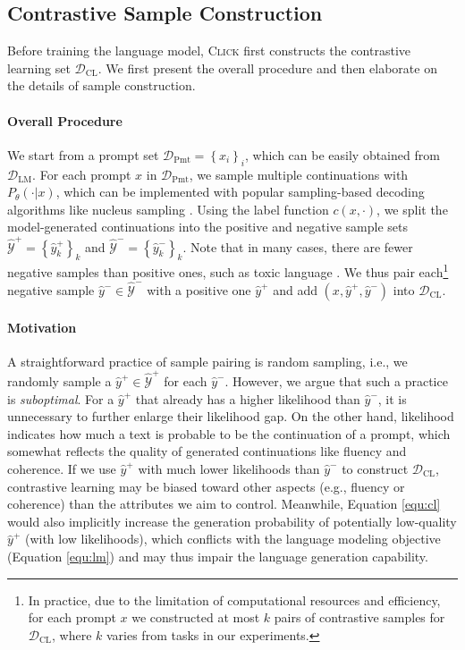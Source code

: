 \subsection{Contrastive Sample Construction}
\label{subsec:construction}

Before training the language model, \textsc{Click} first constructs the contrastive learning set $\mathcal{D}_\mathrm{CL}$.
We first present the overall procedure and then elaborate on the details of sample construction.

\paragraph{Overall Procedure} We start from a prompt set $\mathcal{D}_\mathrm{Pmt} = \left\{ x_i \right\}_i$, which can be easily obtained from $\mathcal{D}_\mathrm{LM}$.
For each prompt $x$ in $\mathcal{D}_\mathrm{Pmt}$, we sample multiple continuations with $P_{\theta} (\cdot | x )$, which can be implemented with popular sampling-based decoding algorithms like nucleus sampling \cite{topp}. Using the label function $c(x , \cdot )$, we split the model-generated continuations into the positive and negative sample sets $\widehat{\mathcal{Y}}^{+} = \left\{ \hat{y}_k^{+} \right\}_{k}$ and $\widehat{\mathcal{Y}}^{-} = \left\{ \hat{y}_k^{-} \right\}_{k}$.
Note that in many cases, there are fewer negative samples than positive ones, such as toxic language \cite{bad, red-teaming}. We thus pair each\footnote{
  In practice, due to the limitation of computational resources and efficiency, for each prompt $x$ we constructed at most $k$ pairs of contrastive samples for $\mathcal{D}_\mathrm{CL}$, where $k$ varies from tasks in our experiments. } negative sample $\hat{y}^{-} \in \widehat{\mathcal{Y}}^{-}$ with a positive one $\hat{y}^{+}$ and add $(x, \hat{y}^{+}, \hat{y}^{-})$ into $\mathcal{D}_\mathrm{CL}$.

\paragraph{Motivation}
A straightforward practice of sample pairing is random sampling, i.e., we randomly sample a $\hat{y}^{+} \in \widehat{\mathcal{Y}}^{+}$ for each $\hat{y}^{-}$.
However, we argue that such a practice is \textit{suboptimal}.
For a $\hat{y}^{+}$ that already has a higher likelihood than $\hat{y}^{-}$, it is unnecessary to further enlarge their likelihood gap. On the other hand, likelihood indicates how much a text is probable to be the continuation of a prompt, which somewhat reflects the quality of generated continuations like fluency and coherence. If we use $\hat{y}^{+}$ with much lower likelihoods than $\hat{y}^{-}$ to construct $\mathcal{D}_\mathrm{CL}$, contrastive learning may be biased toward other aspects (e.g., fluency or coherence) than the attributes we aim to control. Meanwhile, Equation \ref{equ:cl} would also implicitly increase the generation probability of potentially low-quality $\hat{y}^{+}$ (with low likelihoods), which conflicts with the language modeling objective (Equation \ref{equ:lm}) and may thus impair the language generation capability.


